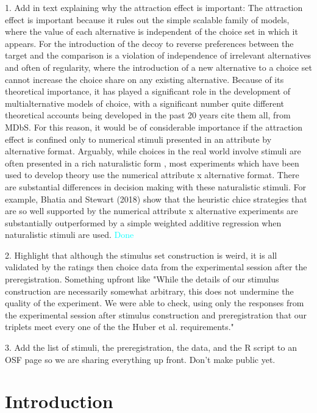 \documentclass[12pt, a4paper]{article}
\newcommand{\AT}[1] {{\textcolor{cyan}{#1}}}
\begin{document}
1. Add in text explaining why the attraction effect is important: The attraction effect is important because it rules out the simple scalable family of models, where the value of each alternative is independent of the choice set in which it appears. For the introduction of the decoy to reverse preferences between the target and the comparison is a violation of independence of irrelevant alternatives and often of regularity, where the introduction of a new alternative to a choice set cannot increase the choice share on any existing alternative. Because of its theoretical importance, it has played a significant role in the development of multialternative models of choice, with a significant number quite different theoretical accounts being developed in the past 20 years {cite them all, from MDbS}. For this reason, it would be of considerable importance if the attraction effect is confined only to numerical stimuli presented in an attribute by alternative format. Arguably, while choices in the real world involve stimuli are often presented in a rich naturalistic form \cite{Bhatia2018b}, most experiments which have been used to develop theory use the numerical attribute x alternative format. There are substantial differences in decision making with these naturalistic stimuli. For example, Bhatia and Stewart (2018) show that the heuristic chice strategies that are so well supported by  the numerical attribute x alternative experiments are substantially outperformed by a simple weighted additive regression when naturalistic stimuli are used. \AT{Done}

2. Highlight that although the stimulus set construction is weird, it is all validated by the ratings then choice data from the experimental session after the preregistration. Something upfront like "While the details of our stimulus construction are necessarily somewhat arbitrary, this does not undermine the quality of the experiment. We were able to check, using only the responses from the experimental session after stimulus construction and preregistration that our triplets meet every one of the the Huber et al. requirements."

3. Add the list of stimuli, the preregistration, the data, and the R script to an OSF page so we are sharing everything up front. Don't make public yet. 
\section{Introduction}

\end{document}
